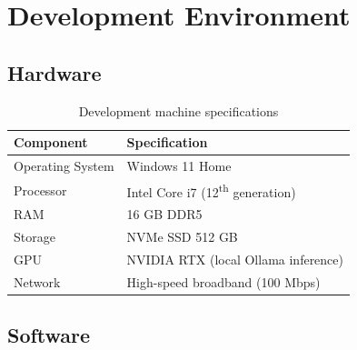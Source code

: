 \section{Development Environment}

\subsection{Hardware}

\begin{table}[H]
\centering
\caption{Development machine specifications}
\begin{tabular}{|l|l|}
\hline
\rowcolor{gray!20}
\textbf{Component} & \textbf{Specification} \\
\hline
Operating System & Windows 11 Home \\
\hline
Processor & Intel Core i7 (12\textsuperscript{th} generation) \\
\hline
RAM & 16 GB DDR5 \\
\hline
Storage & NVMe SSD 512 GB \\
\hline
GPU & NVIDIA RTX (local Ollama inference) \\
\hline
Network & High-speed broadband (100 Mbps) \\
\hline
\end{tabular}
\end{table}

\subsection{Software}

